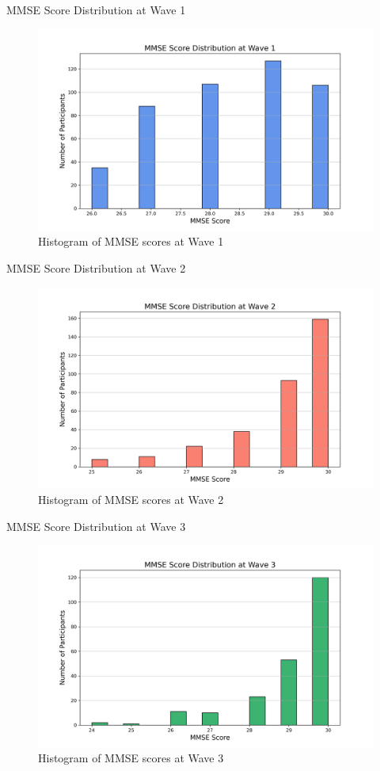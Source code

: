 \documentclass{beamer}
\begin{document}
\begin{frame}{MMSE Score Distribution at Wave 1}
  \begin{figure}
    \centering
    \includegraphics[width=0.8\linewidth]{mmse_w1_distribution.png}
    \caption{Histogram of MMSE scores at Wave 1}
  \end{figure}
\end{frame}

\begin{frame}{MMSE Score Distribution at Wave 2}
  \begin{figure}
    \centering
    \includegraphics[width=0.8\linewidth]{mmse_w2_distribution.png}
    \caption{Histogram of MMSE scores at Wave 2}
  \end{figure}
\end{frame}

\begin{frame}{MMSE Score Distribution at Wave 3}
  \begin{figure}
    \centering
    \includegraphics[width=0.8\linewidth]{mmse_w3_distribution.png}
    \caption{Histogram of MMSE scores at Wave 3}
  \end{figure}
\end{frame}
\end{document}

